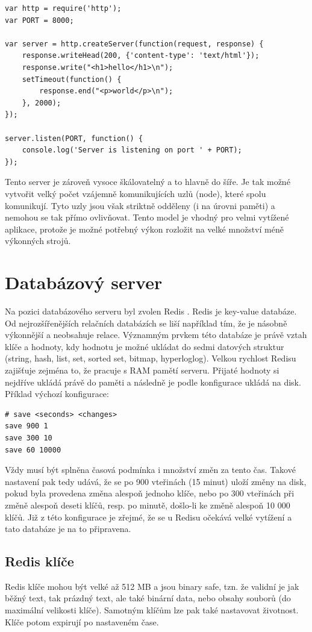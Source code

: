 \begin{verbatim}
var http = require('http');
var PORT = 8000;

var server = http.createServer(function(request, response) {
	response.writeHead(200, {'content-type': 'text/html'});
	response.write("<h1>hello</h1>\n");
	setTimeout(function() {
		response.end("<p>world</p>\n");
	}, 2000);
});

server.listen(PORT, function() {
	console.log('Server is listening on port ' + PORT);
});
\end{verbatim}

Tento server je zároveň vysoce škálovatelný a to hlavně do šíře. Je tak možné vytvořit velký počet vzájemně komunikujících uzlů (node), které spolu komunikují. Tyto uzly jsou však striktně odděleny (i na úrovni paměti) a nemohou se tak přímo ovlivňovat. Tento model je vhodný pro velmi vytížené aplikace, protože je možné potřebný výkon rozložit na velké množství méně výkonných strojů.

\section{Databázový server}
Na pozici databázového serveru byl zvolen Redis \cite{redis}. Redis je key-value databáze. Od nejrozšířenějších relačních databázích se liší například tím, že je násobně výkonnější a neobsahuje relace. Významným prvkem této databáze je právě vztah klíče a hodnoty, kdy hodnotu je možné ukládat do sedmi datových struktur (string, hash, list, set, sorted set, bitmap, hyperloglog). Velkou rychlost Redisu zajišťuje zejména to, že pracuje s RAM pamětí serveru. Přijaté hodnoty si nejdříve ukládá právě do paměti a následně je podle konfigurace ukládá na disk. Příklad výchozí konfigurace:

\begin{verbatim}
# save <seconds> <changes>
save 900 1
save 300 10
save 60 10000
\end{verbatim}

Vždy musí být splněna časová podmínka i množství změn za tento čas. Takové nastavení pak tedy udává, že se po 900 vteřinách (15 minut) uloží změny na disk, pokud byla provedena změna alespoň jednoho klíče, nebo po 300 vteřinách při změně alespoň deseti klíčů, resp. po minutě, došlo-li ke změně alespoň 10 000 klíčů. Již z této konfigurace je zřejmé, že se u Redisu očekává velké vytížení a tato databáze je na to připravena.

\subsection{Redis klíče}
Redis klíče mohou být velké až 512 MB a jsou binary safe, tzn. že validní je jak běžný text, tak prázdný text, ale také binární data, nebo obsahy souborů (do maximální velikosti klíče). Samotným klíčům lze pak také nastavovat životnost. Klíče potom expirují po nastaveném čase.

